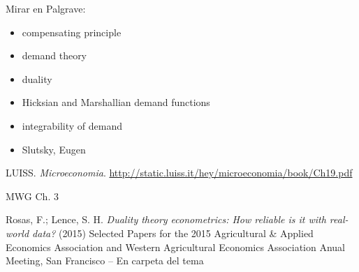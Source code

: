 \documentclass{nuevotema}
\begin{document}
Mirar en Palgrave:
\begin{itemize}
	\item compensating principle
	\item demand theory
	\item duality
	\item Hicksian and Marshallian demand functions
	\item integrability of demand
	\item Slutsky, Eugen
\end{itemize}

LUISS. \textit{Microeconomia}. \url{http://static.luiss.it/hey/microeconomia/book/Ch19.pdf}

MWG Ch. 3

Rosas, F.; Lence, S. H. \textit{Duality theory econometrics: How reliable is it with real-world data?} (2015) Selected Papers for the 2015 Agricultural \& Applied Economics Association and Western Agricultural Economics Association Anual Meeting, San Francisco -- En carpeta del tema
\end{document}
